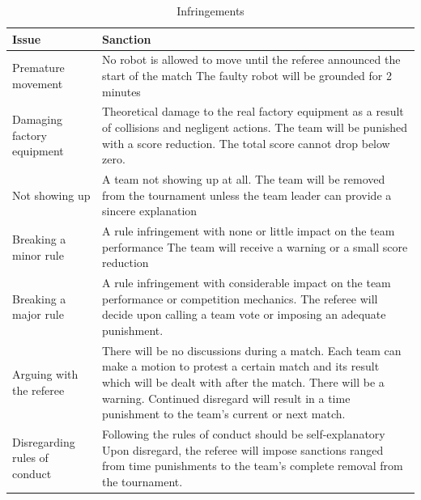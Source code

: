 \documentclass[12pt,twoside]{article}
\begin{document}
\begin{table}[thpb]
  \centering
  \begin{tabularx}{\linewidth}{l|X}
  \multicolumn{1}{l}{Issue} &\multicolumn{1}{l}{Sanction}\\\hline
  Premature movement & No robot is allowed to move until the referee
  announced the start of the match The faulty robot will be grounded
  for
  2 minutes\\[1ex]
%
  Damaging factory equipment & Theoretical damage to the real
  factory equipment as a result of collisions and negligent actions.
  The team will be punished with a score reduction. The total score
  cannot  drop below zero.\\[1ex]
%
  Not showing up & A team not showing up at all. The team will be
  removed from the tournament unless the team leader can provide a
  sincere explanation\\[1ex]
%
  Breaking a minor rule & A rule infringement with none or little
  impact on the team performance The team will receive a warning or a
  small  score reduction\\[1ex]
%
  Breaking a major rule & A rule infringement with considerable impact
  on the team performance or competition mechanics. The referee will
  decide upon calling a team vote or imposing an adequate punishment.\\[1ex]
%
  Arguing with the referee & There will be no discussions during a
  match. Each team can make a motion to protest a certain match and
  its result which will be dealt with after the match. There will be a
  warning. Continued disregard will result in a time punishment to the
  team's current or next match.\\[1ex]
%
  Disregarding rules of conduct & Following the rules of conduct
  should be self-explanatory Upon disregard, the referee will impose
  sanctions ranged from time punishments to the team's complete
  removal from the tournament.\\\hline
  \end{tabularx}  
  \caption{Infringements}
  \label{tab:infringements}
\end{table}
\end{document}
